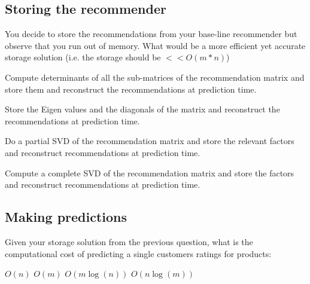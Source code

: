 \documentclass{exam}
\begin{document}
\subsection{Storing the recommender}
You decide to store the recommendations from your base-line recommender but observe that you run out of memory.
What would be a more efficient yet accurate storage solution (i.e. the storage should be $ << O(m*n)$)

\begin{choices}
 \choice Compute determinants of all the sub-matrices of the recommendation matrix and store them and reconstruct the recommendations at prediction time.
 
 \choice Store the Eigen values and the diagonals of the matrix and reconstruct the recommendations at prediction time.
 
 \choice Do a partial SVD of the recommendation matrix and store the relevant factors and reconstruct recommendations at prediction time.
 
 \choice Compute a complete SVD  of the recommendation matrix and store the factors and reconstruct recommendations at prediction time.
\end{choices}

\subsection{Making predictions}
Given your storage solution from the previous question, what is the computational cost of predicting a single customers ratings for products:

\begin{oneparchoices}
\choice $O(n)$
\choice $O(m)$
\choice $O(m\log(n))$
\choice $O(n\log(m))$
\end{oneparchoices}
\end{document}

